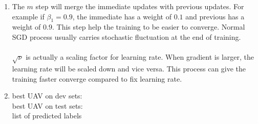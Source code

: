 \documentclass[10pt]{article}
\begin{document}
\begin{enumerate}[label=(\alph*)]
\item
The $m$ step will merge the immediate updates with previous updates.
For example if $\beta_1 = 0.9$, the immediate has a weight of $0.1$ and previous has a weight of $0.9$.
This step help the training to be easier to converge.
Normal SGD process usually carries stochastic fluctuation at the end of training.\\
\\
$\sqrt{\nu}$ is actually a scaling factor for learning rate.
When gradient is larger, the learning rate will be scaled down and vice versa.
This process can give the training faster converge compared to fix learning rate.

\item
best UAV on dev sets:\\
best UAV on test sets:\\

list of predicted labels

\end{enumerate}


\pagebreak[4]
\end{document}
